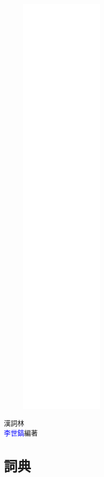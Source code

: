 \documentclass[a5paper,12pt]{article}
\begin{document}
\linespread{1.25}
\begin{figure}
\includegraphics[height=220mm]{cover.png}
\end{figure}
\hfill
\vfill
{\fontsize{32}{32}\textcolor{deepblue}{漢詞林}}\\
{\textcolor{blue}{李世鎬}\hspace{14pt}編著}
\vspace{64pt}
\newpage
\addtolength{\topmargin}{20mm}
\linespread{1.25}


\section{詞典}


\appendix
\printbibliography
\end{document}
